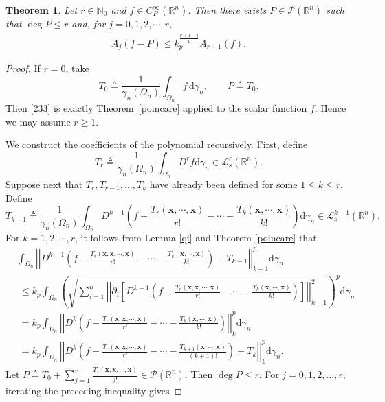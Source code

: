 \documentclass[12pt]{article}
\theoremstyle{plain}
\newtheorem{theorem}{Theorem}[section]
\theoremstyle{definition}
\theoremstyle{remark}
\numberwithin{equation}{section}
\begin{document}
\begin{theorem}\label{bijin}
Let $r\in\mathbb{N}_0$ and $f\in C_P^{\infty}(\mathbb{R}^{n})$. Then there exists $P\in \mathcal{P} \left( \mathbb{R}^{n} \right)$ such that $\deg P\leqslant r$ and, for $j=0,1,2,\cdots ,r$,
\begin{eqnarray}
	A_{j}\left( f-P \right) \leqslant  k_{p}^{\frac{r+1-j}{p}}A_{r+1}\left( f \right).\label{233}
\end{eqnarray}
\end{theorem}
\begin{proof}
If $r=0$, take
$$T_0\triangleq\frac{1}{\gamma_n(\Omega_n)}\int_{\Omega_n}f\,\mathrm d\gamma_n,
\qquad P\triangleq T_0.$$
Then \eqref{233} is exactly Theorem~\ref{poincare} applied to the scalar function $f$.  Hence we may assume $r\geqslant1$.

We construct the coefficients of the polynomial recursively.  First, define
$$T_{r}\triangleq \frac{1}{\gamma_{n} \left( \Omega_n \right)} \int_{\Omega_n} D^{r}f\mathrm{d} \gamma_{n} \in \mathcal{L}_{s}^{r} \left( \mathbb{R}^{n} \right).$$
Suppose next that $T_r,T_{r-1},\ldots,T_k$ have already been defined for some $1\leqslant k\leqslant r$.  Define
$$T_{k-1}\triangleq \frac{1}{\gamma_{n} \left( \Omega_n \right)} \int_{\Omega_n} D^{k-1}\left( f-\frac{T_{r}\left( \textbf{x} ,\cdots ,\textbf{x} \right)}{r!} -\cdots -\frac{T_{k}\left( \textbf{x} ,\cdots ,\textbf{x} \right)}{k!} \right) \mathrm{d} \gamma_{n} \in \mathcal{L}_{s}^{k-1} \left( \mathbb{R}^{n} \right).$$
For $k=1,2,\cdots ,r$, it follows from Lemma \ref{qi} and Theorem \ref{poincare} that$$\begin{aligned}
	&\int_{\Omega_n} \left| \left| D^{k-1}\left( f-\frac{T_{r}\left( \textbf{x} ,\textbf{x} ,\cdots ,\textbf{x} \right)}{r!} -\cdots -\frac{T_{k}\left( \textbf{x} ,\cdots ,\textbf{x} \right)}{k!} \right) -T_{k-1} \right| \right|_{k-1}^{p} \mathrm{d} \gamma_{n}\\ &\  \leqslant k_{p}\int_{\Omega_n} \left( \sqrt{\sum_{i=1}^{n} \left| \left| \partial_{i} \left[ D^{k-1}\left( f-\frac{T_{r}\left( \textbf{x} ,\textbf{x} ,\cdots ,\textbf{x} \right)}{r!} -\cdots -\frac{T_{k}\left( \textbf{x} ,\cdots ,\textbf{x} \right)}{k!} \right) \right] \right| \right|_{k-1}^{2}} \right)^{p} \mathrm{d} \gamma_{n}\\ &\  =k_{p}\int_{\Omega_n} \left| \left| D^{k}\left( f-\frac{T_{r}\left( \textbf{x} ,\textbf{x} ,\cdots ,\textbf{x} \right)}{r!} -\cdots -\frac{T_{k}\left( \textbf{x} ,\cdots ,\textbf{x} \right)}{k!} \right) \right| \right|_{k}^{p} \mathrm{d} \gamma_{n}\\ &\  =k_{p}\int_{\Omega_n} \left| \left| D^{k}\left( f-\frac{T_{r}\left( \textbf{x} ,\textbf{x} ,\cdots ,\textbf{x} \right)}{r!} -\cdots -\frac{T_{k+1}\left( \textbf{x} ,\cdots ,\textbf{x} \right)}{\left( k+1 \right) !} \right) -T_{k} \right| \right|_{k}^{p} \mathrm{d} \gamma_{n} .\end{aligned}$$	Let $P\triangleq T_{0}+\sum_{j=1}^{r} \frac{T_{j}\left( \textbf{x} ,\textbf{x}, \cdots ,\textbf{x} \right)}{j!}\in \mathcal{P} \left( \mathbb{R}^{n} \right)$.  Then $\deg P\leqslant r$.  For $j=0,1,2,\ldots,r$, iterating the preceding inequality gives

\end{proof}
\end{document}
